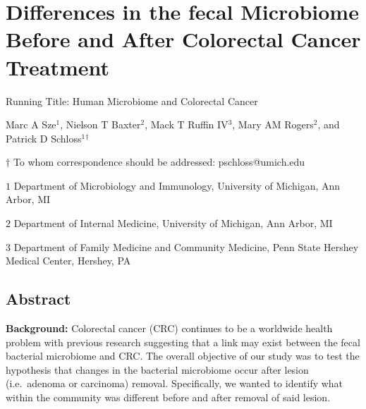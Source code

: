 \documentclass[12pt,]{article}
\title{}
\author{}
\date{}
\begin{document}
\section{Differences in the fecal Microbiome Before and After Colorectal
Cancer
Treatment}\label{differences-in-the-fecal-microbiome-before-and-after-colorectal-cancer-treatment}

\vspace{25mm}

\begin{center}
Running Title: Human Microbiome and Colorectal Cancer

\vspace{10mm}

Marc A Sze${^1}$, Nielson T Baxter${^2}$, Mack T Ruffin IV${^3}$, Mary AM Rogers${^2}$, and Patrick D Schloss${^1}$${^\dagger}$

\vspace{20mm}

$\dagger$ To whom correspondence should be addressed: pschloss@umich.edu

$1$ Department of Microbiology and Immunology, University of Michigan, Ann Arbor, MI

$2$ Department of Internal Medicine, University of Michigan, Ann Arbor, MI   

$3$ Department of Family Medicine and Community Medicine, Penn State Hershey Medical Center, Hershey, PA    


\end{center}

\newpage

\linenumbers

\subsection{Abstract}\label{abstract}

\textbf{Background:} Colorectal cancer (CRC) continues to be a worldwide
health problem with previous research suggesting that a link may exist
between the fecal bacterial microbiome and CRC. The overall objective of
our study was to test the hypothesis that changes in the bacterial
microbiome occur after lesion (i.e.~adenoma or carcinoma) removal.
Specifically, we wanted to identify what within the community was
different before and after removal of said lesion.
\end{document}
